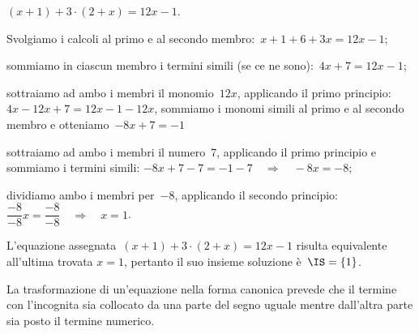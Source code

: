 \begin{exrig}
 \begin{esempio}
$(x+1)+3\cdot (2+x)=12x-1$.

\begin{enumeratea}
\item Svolgiamo i calcoli al primo e al secondo membro:~$x+1+6+3x=12x-1$;
\item sommiamo in ciascun membro i termini simili (se ce ne sono):~$4x+7=12x-1$;
\item sottraiamo ad ambo i membri il monomio~$12x$, applicando il primo principio:~$4x-12x+7=12x-1-12x$, sommiamo i
monomi simili al primo e al secondo membro e otteniamo~$-8x+7=-1$
\item sottraiamo ad ambo i membri il numero~7, applicando il primo principio e sommiamo i termini simili:
$-8x+7-7=-1-7\quad\Rightarrow\quad -8x=-8$;
\item dividiamo ambo i membri per~$-8$,
applicando il secondo principio:
$\dfrac{-8}{-8}x=\dfrac{-8}{-8}\quad\Rightarrow\quad x=1$.
\end{enumeratea}
L'equazione assegnata~$(x+1)+3\cdot (2+x)=12x-1$
risulta equivalente all'ultima trovata $x=1$, pertanto il
suo insieme soluzione è~$\IS = \{1\}$.
 \end{esempio}
\end{exrig}

\vspace{1.10ex}\ovalbox{\risolvii \ref{ese:15.2}, \ref{ese:15.3}, \ref{ese:15.4}, \ref{ese:15.5}, \ref{ese:15.6}, \ref{ese:15.7}, \ref{ese:15.8}, \ref{ese:15.9}, \ref{ese:15.10}, \ref{ese:15.11}, \ref{ese:15.12}, \ref{ese:15.13}}

\osservazione
La trasformazione di un'equazione nella forma canonica
prevede che il termine con l'incognita sia collocato da
una parte del segno uguale mentre dall'altra parte sia
posto il termine numerico.

